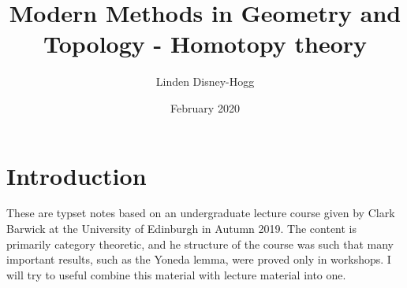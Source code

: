 \documentclass{article}
\title{Modern Methods in Geometry and Topology - Homotopy theory}
\author{Linden Disney-Hogg}
\date{February 2020}
\begin{document}
\maketitle
\tableofcontents

\section{Introduction}
These are typset notes based on an undergraduate lecture course given by Clark Barwick at the University of Edinburgh in Autumn 2019. The content is primarily category theoretic, and he structure of the course was such that many important results, such as the Yoneda lemma, were proved only in workshops. I will try to useful combine this material with lecture material into one. 
\end{document}
